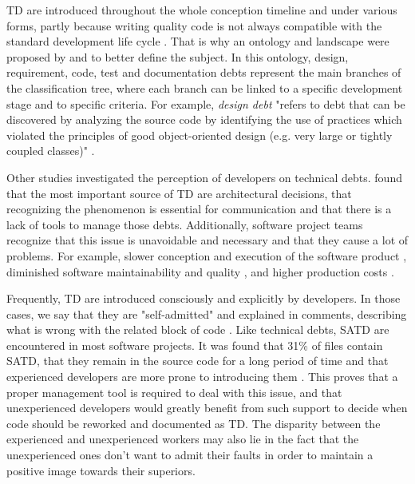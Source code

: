 \ac{TD} are introduced throughout the whole conception timeline and under various forms, partly because writing quality code is not always compatible with the standard development life cycle \citep{brown2010managing}. That is why an ontology and landscape were proposed by \citet{alves2014towards} and \citet{izurieta2012organizing} to better define the subject. In this ontology, design, requirement, code, test and documentation debts represent the main branches of the classification tree, where each branch can be linked to a specific development stage and to specific criteria. For example, \emph{design debt} "refers to debt that can be discovered by analyzing the source code by identifying the use of practices which violated the principles of good object-oriented design (e.g. very large or tightly coupled classes)" \citep{alves2014towards}. \par

Other studies investigated the perception of developers on technical debts. \citet{Ernst:2015:MMI:2786805.2786848} found that the most important source of \ac{TD} are architectural decisions, that recognizing the phenomenon is essential for communication and that there is a lack of tools to manage those debts. Additionally, software project teams recognize that this issue is unavoidable and necessary \citep{lim2012balancing} and that they cause a lot of problems. For example, slower conception and execution of the software product \citep{allman2012managing}, diminished software maintainability and quality \citep{wehaibi2016examining,zazworka2011investigating}, and higher production costs \citep{guo2011tracking}. \par

Frequently, \ac{TD} are introduced consciously and explicitly by developers. In those cases, we say that they are "self-admitted" and explained in comments, describing what is wrong with the related block of code \citep{PotdarS14}. Like technical debts, SATD are encountered in most software projects. It was found that 31\% of files contain \ac{SATD}, that they remain in the source code for a long period of time and that experienced developers are more prone to introducing them \citep{PotdarS14}. This proves that a proper management tool is required to deal with this issue, and that unexperienced developers would greatly benefit from such support to decide when code should be reworked and documented as \ac{TD}. The disparity between the experienced and unexperienced workers may also lie in the fact that the unexperienced ones don't want to admit their faults in order to maintain a positive image towards their superiors. \par

